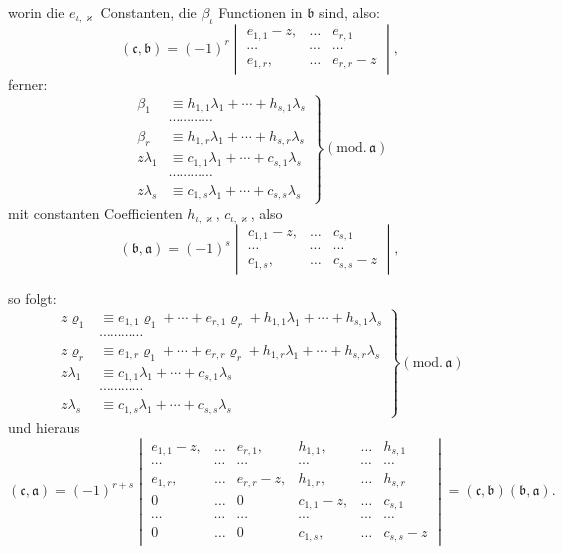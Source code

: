 \documentclass{article}
\begin{document}
worin die $e_{\iota,\varkappa}$ Constanten, die $\beta_{\iota}$ Functionen in $\mathfrak{b}$ sind, also:
\[ (\mathfrak{c}, \mathfrak{b}) = (-1)^{r} \begin{vmatrix} e_{1,1}-z, & \ldots & e_{r,1} \\ \cdots & \cdots & \cdots \\ e_{1,r}, & \ldots & e_{r,r}-z \end{vmatrix}, \]
ferner:
\[ \left. \begin{aligned} \beta_{1} &\equiv h_{1,1}\lambda_{1} + \cdots + h_{s,1}\lambda_{s} \\ &\cdots\cdots\cdots\cdots \\ \beta_{r} &\equiv h_{1,r}\lambda_{1} + \cdots + h_{s,r}\lambda_{s} \\ z\lambda_{1} &\equiv c_{1,1}\lambda_{1} + \cdots + c_{s,1}\lambda_{s} \\ &\cdots\cdots\cdots\cdots \\ z\lambda_{s} &\equiv c_{1,s}\lambda_{1} + \cdots + c_{s,s}\lambda_{s} \end{aligned} \right\} (\text{mod.}\,\mathfrak{a}) \]
mit constanten Coefficienten $h_{\iota,\varkappa}$, $c_{\iota,\varkappa}$, also
\[ (\mathfrak{b}, \mathfrak{a}) = (-1)^{s} \begin{vmatrix} c_{1,1}-z, & \ldots & c_{s,1} \\ \cdots & \cdots & \cdots \\ c_{1,s}, & \ldots & c_{s,s}-z \end{vmatrix}, \]

so folgt:
\[ \left. \begin{aligned} z\varrho_{1} &\equiv e_{1,1}\varrho_{1} + \cdots + e_{r,1}\varrho_{r} + h_{1,1}\lambda_{1} + \cdots + h_{s,1}\lambda_{s} \\ &\cdots\cdots\cdots\cdots \\ z\varrho_{r} &\equiv e_{1,r}\varrho_{1} + \cdots + e_{r,r}\varrho_{r} + h_{1,r}\lambda_{1} + \cdots + h_{s,r}\lambda_{s} \\ z\lambda_{1} &\equiv c_{1,1}\lambda_{1} + \cdots + c_{s,1}\lambda_{s} \\ &\cdots\cdots\cdots\cdots \\ z\lambda_{s} &\equiv c_{1,s}\lambda_{1} + \cdots + c_{s,s}\lambda_{s} \end{aligned} \right\} (\text{mod.}\,\mathfrak{a}) \]
und hieraus
\[ (\mathfrak{c}, \mathfrak{a}) = (-1)^{r+s} \begin{vmatrix} e_{1,1}-z, & \ldots & e_{r,1}, & h_{1,1}, & \ldots & h_{s,1} \\ \cdots & \cdots & \cdots & \cdots & \cdots & \cdots \\ e_{1,r}, & \ldots & e_{r,r}-z, & h_{1,r}, & \ldots & h_{s,r} \\ 0 & \ldots & 0 & c_{1,1}-z, & \ldots & c_{s,1} \\ \cdots & \cdots & \cdots & \cdots & \cdots & \cdots \\ 0 & \ldots & 0 & c_{1,s}, & \ldots & c_{s,s}-z \end{vmatrix} = (\mathfrak{c}, \mathfrak{b})(\mathfrak{b}, \mathfrak{a}). \]
\end{document}
